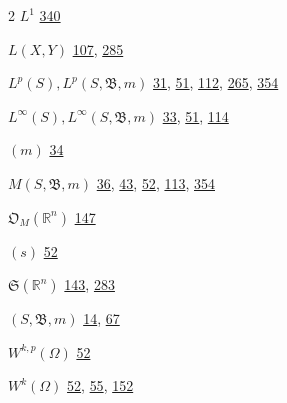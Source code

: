 \begin{multicols}{2}
\noindent $L^{1}$ \hyperlink{page.340}{340}\par
\noindent $L(X, Y)$ \hyperlink{page.107}{107}, \hyperlink{page.285}{285}\par
\noindent $ L^{p}(S), L^{p}(S, \mathfrak{B}, m) $ \hyperlink{page.31}{31}, \hyperlink{page.51}{51}, \hyperlink{page.112}{112}, \hyperlink{page.265}{265}, \hyperlink{page.354}{354}\par
\noindent $ L^{\infty}(S), L^{\infty}(S, \mathfrak{B}, m) $ \hyperlink{page.33}{33}, \hyperlink{page.51}{51}, \hyperlink{page.114}{114}\par
\noindent $(m)$ \hyperlink{page.34}{34}\par
\noindent $ M(S, \mathfrak{B}, m) $ \hyperlink{page.36}{36}, \hyperlink{page.43}{43}, \hyperlink{page.52}{52}, \hyperlink{page.113}{113}, \hyperlink{page.354}{354}\par
\noindent $ \mathfrak{O}_{M}(\mathbb{R}^{n}) $ \hyperlink{page.147}{147}\par
\hspace*{1.1em}$(s)$ \hyperlink{page.52}{52}\par
\noindent $ \mathfrak{S}(\mathbb{R}^{n}) $ \hyperlink{page.143}{143}, \hyperlink{page.283}{283}\par
\hspace*{1.1em}$(S, \mathfrak{B}, m)$ \hyperlink{page.14}{14}, \hyperlink{page.67}{67}\par
\noindent $ W^{k,p}(\Omega) $ \hyperlink{page.52}{52}\par
\noindent $ W^{k}(\Omega) $ \hyperlink{page.52}{52}, \hyperlink{page.55}{55}, \hyperlink{page.152}{152}\par
\end{multicols}
